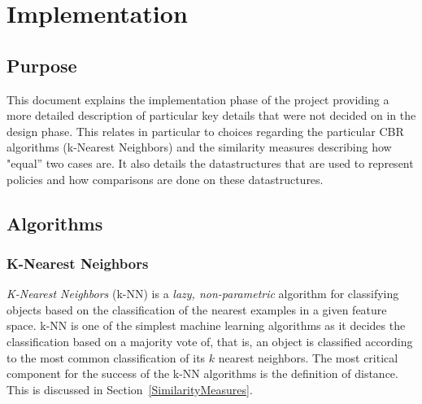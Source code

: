  
 

\chapter{Implementation}\label{impl}

\minitoc

\section*{Purpose}
This document explains the implementation phase of the project providing a more detailed description of particular key
details that were not decided on in the design phase. This relates in particular to choices regarding the particular CBR algorithms
(k-Nearest Neighbors) and the similarity measures describing how "equal'' two cases are. It also details the datastructures that
are used to represent policies and how comparisons are done on these datastructures.

\section{Algorithms}

\subsection{K-Nearest Neighbors}

\emph{K-Nearest Neighbors} (k-NN) is a \emph{lazy, non-parametric} algorithm for classifying objects based on the classification of the nearest examples in a given feature space. k-NN is one of the simplest machine learning algorithms as it decides the classification based on a majority vote of, that is, an object is classified according to the most common classification of its $k$ nearest neighbors. The most critical component for the success of the k-NN algorithms is the definition of distance. This is discussed in Section~\ref{SimilarityMeasures}. 

